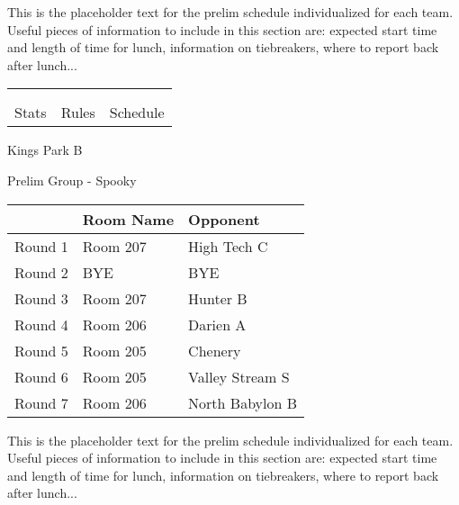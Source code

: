 \documentclass{article}%
\begin{document}
\vspace*{30pt}%
\linebreak%
This is the placeholder text for the prelim schedule individualized for each team. Useful pieces of information to include in this section are: expected start time and length of time for lunch, information on tiebreakers, where to report back after lunch...%
\vspace*{30pt}%
\newline%
%
\begin{tabularx}{\textwidth}{YYY}%
  &  &  \\%
\\%
Stats&Rules&Schedule\\%
\end{tabularx}%
\newpage%
%
\begin{center}%
\begin{Huge}%
Kings Park B%
\end{Huge}%
\vspace*{12pt}%
\linebreak%
\begin{Large}%
Prelim Group {-} Spooky%
\end{Large}%
\end{center}%
\vspace*{4pt}%
\begin{tabularx}{\textwidth}{|c|Y|Y|}%
\hline%
&Room Name&Opponent\\%
\hline%
Round 1&Room 207&High Tech C\\%
Round 2&BYE&BYE\\%
Round 3&Room 207&Hunter B\\%
Round 4&Room 206&Darien A\\%
Round 5&Room 205&Chenery\\%
Round 6&Room 205&Valley Stream S\\%
Round 7&Room 206&North Babylon B\\%
\hline%
\end{tabularx}%
\vspace*{30pt}%
\linebreak%
This is the placeholder text for the prelim schedule individualized for each team. Useful pieces of information to include in this section are: expected start time and length of time for lunch, information on tiebreakers, where to report back after lunch...%
\end{document}
